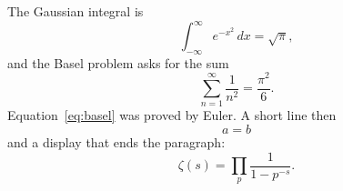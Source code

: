 \documentclass{article}
\begin{document}
The Gaussian integral is
\[ \int_{-\infty}^{\infty} e^{-x^2}\,dx = \sqrt{\pi}, \]
and the Basel problem asks for the sum
\begin{equation}\label{eq:basel}
  \sum_{n=1}^{\infty} \frac{1}{n^2} = \frac{\pi^2}{6}.
\end{equation}
Equation~\eqref{eq:basel} was proved by Euler. A short line then
\[ a = b \]
and a display that ends the paragraph:
\begin{equation}
  \zeta(s) = \prod_{p} \frac{1}{1 - p^{-s}}.
\end{equation}
\end{document}
